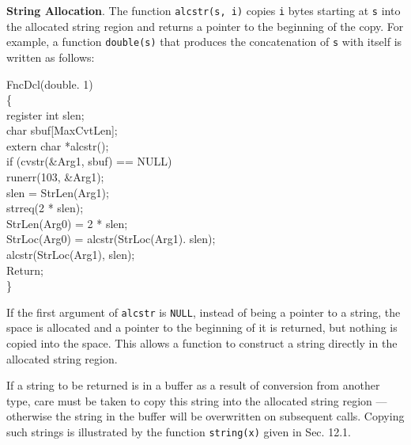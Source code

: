\textbf{String Allocation}. The function \texttt{alcstr(s, i)} copies
\texttt{i} bytes starting at \texttt{s} into the allocated string region
and returns a pointer to the beginning of the copy. For example, a function
\texttt{double(s)} that produces the concatenation of \texttt{s} with
itself is written as follows:
\goodbreak
\begin{iconcode}
\color{red}FncDcl(double. 1)\\
\{\\
\>register int slen;\\
\>char sbuf[MaxCvtLen];\\
\>extern char *alcstr();\\
\>if (cvstr(\&Arg1, sbuf) == NULL)\\
\>\>runerr(103, \&Arg1);\\
\>slen = StrLen(Arg1);\\
\>strreq(2 * slen);\\
\>StrLen(Arg0) = 2 * slen;\\
\>StrLoc(Arg0) = alcstr(StrLoc(Arg1). slen);\\
\>alcstr(StrLoc(Arg1), slen);\\
\>Return;\\
\}
\end{iconcode}

If the first argument of \texttt{alcstr} is \texttt{NULL}, instead of being
a pointer to a string, the space is allocated and a pointer to the
beginning of it is returned, but nothing is copied into the space. This
allows a function to construct a string directly in the allocated string
region.

If a string to be returned is in a buffer as a result of conversion
from another type, care must be taken to copy this string into the
allocated string region --- otherwise the string in the buffer will
be overwritten on subsequent calls. Copying such strings is
illustrated by the function \texttt{string(x)} given in Sec. 12.1.

